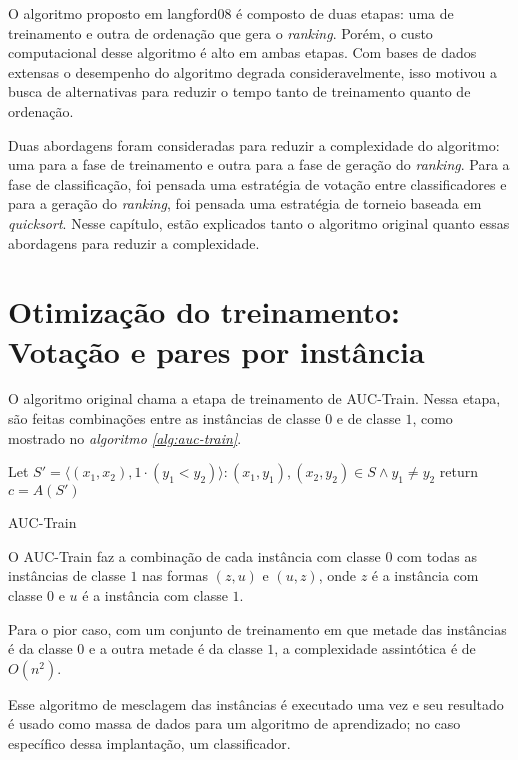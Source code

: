 O algoritmo proposto em {{langford08}} é composto de duas etapas: uma de treinamento e outra de ordenação que gera o \emph{ranking}. Porém, o custo computacional desse algoritmo é alto em ambas etapas. Com bases de dados extensas o desempenho do algoritmo degrada consideravelmente, isso motivou a busca de alternativas para reduzir o tempo tanto de treinamento quanto de ordenação.

Duas abordagens foram consideradas para reduzir a complexidade do algoritmo: uma para a fase de treinamento e outra para a fase de geração do \emph{ranking}. Para a fase de classificação, foi pensada uma estratégia de votação entre classificadores e para a geração do \emph{ranking}, foi pensada uma estratégia de torneio baseada em \emph{quicksort}. Nesse capítulo, estão explicados tanto o algoritmo original quanto essas abordagens para reduzir a complexidade.

\section{Otimização do treinamento: Votação e pares por instância}
O algoritmo original chama a etapa de treinamento de AUC-Train. Nessa etapa, são feitas combinações entre as instâncias de classe $0$ e de classe $1$, como mostrado no \emph{algoritmo \ref{alg:auc-train}}.

\begin{algorithm}
\begin{algorithmic}

\STATE Let $S' = {\langle (x_1, x_2), 1 \cdot (y_1 < y_2) \rangle : (x_1, y_1), (x_2, y_2) \in S \wedge y_1 \neq y_2}$
\STATE return $c = A(S')$

\caption{AUC-Train}
\label{alg:auc-train}

\end{algorithmic}
\end{algorithm}

O AUC-Train faz a combinação de cada instância com classe $0$ com todas as instâncias de classe $1$ nas formas $(z, u)$ e $(u, z)$, onde $z$ é a instância com classe $0$ e $u$ é a instância com classe $1$.

Para o pior caso, com um conjunto de treinamento em que metade das instâncias é da classe $0$ e a outra metade é da classe $1$, a complexidade assintótica é de $O(n^2)$.

Esse algoritmo de mesclagem das instâncias é executado uma vez e seu resultado é usado como massa de dados para um algoritmo de aprendizado; no caso específico dessa implantação, um classificador.


